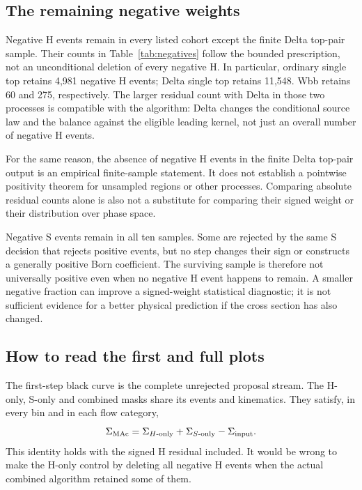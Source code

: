 \subsection{The remaining negative weights}
\label{sec:remaining-negative}

Negative H events remain in every listed cohort except the finite
Delta top-pair sample. Their counts in Table~\ref{tab:negatives} follow
the bounded prescription, not an unconditional deletion of every
negative H. In particular, ordinary single top retains 4,981 negative H
events; Delta single top retains 11,548. Wbb retains 60 and 275,
respectively. The larger residual count with Delta in those two processes
is compatible with the algorithm: Delta changes the conditional source
law and the balance against the eligible leading kernel, not just an
overall number of negative H events.

For the same reason, the absence of negative H events in the finite
Delta top-pair output is an empirical finite-sample statement. It does
not establish a pointwise positivity theorem for unsampled regions or
other processes. Comparing absolute residual counts alone is also not a
substitute for comparing their signed weight or their distribution over
phase space.

Negative S events remain in all ten samples. Some are rejected by the
same S decision that rejects positive events, but no step changes their
sign or constructs a generally positive Born coefficient. The surviving
sample is therefore not universally positive even when no negative H
event happens to remain. A smaller negative fraction can improve a
signed-weight statistical diagnostic; it is not sufficient evidence for
a better physical prediction if the cross section has also changed.

\subsection{How to read the first and full plots}
The first-step black curve is the complete unrejected proposal stream.
The H-only, S-only and combined masks share its events and kinematics.
They satisfy, in every bin and in each flow category,
\begin{equation}
  \Sigma_{\rm MAc}=\Sigma_{H\text{-only}}+
                   \Sigma_{S\text{-only}}-\Sigma_{\rm input}.
 \label{eq:plot-identity}
\end{equation}
This identity holds with the signed H residual included. It would be
wrong to make the H-only control by deleting all negative H events when
the actual combined algorithm retained some of them.

